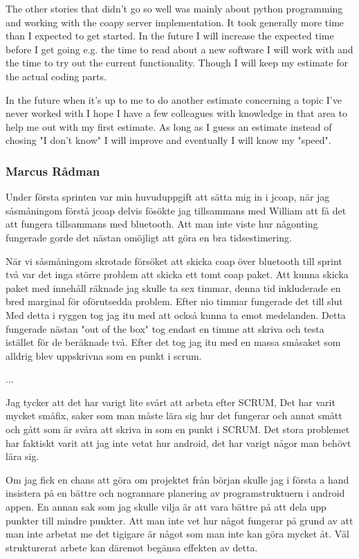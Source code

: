 The other stories that didn't go so well was mainly about python programming and working with the coapy server implementation. 
It took generally more time than I expected to get started.
In the future I will increase the expected time before I get going e.g. the time to read about a new software I will work with and the time to try out the current functionality.
Though I will keep my estimate for the actual coding parts.

In the future when it's up to me to do another estimate concerning a topic I've never worked with I hope I have a few colleagues with knowledge in that area to help me out with my first estimate.
As long as I guess an estimate instead of chosing "I don't know" I will improve and eventually I will know my "speed".

\subsubsection{Marcus Rådman}
Under första sprinten var min huvuduppgift att sätta mig in i jcoap, när jag såsmåningom förstå jcoap delvis fösökte jag tillsammans med William att få det att fungera tillsammans med bluetooth.
Att man inte viste hur någonting fungerade gorde det nästan omöjligt att göra en bra tidsestimering. 

När vi såsmåningom skrotade försöket att skicka coap över bluetooth till sprint två var det inga större problem att skicka ett tomt coap paket.
Att kunna skicka paket med innehåll räknade jag skulle ta sex timmar, denna tid inkluderade en bred marginal för oförutsedda problem. Efter nio timmar fungerade det till slut
Med detta i ryggen tog jag itu med att också kunna ta emot medelanden. Detta fungerade nästan "out of the box" tog endast en timme att skriva och testa istället för de beräknade två.
Efter det tog jag itu med en massa småsaket som alldrig blev uppskrivna som en punkt i scrum.

...

Jag tycker att det har varigt lite svårt att arbeta efter SCRUM, 
Det har varit mycket småfix, saker som man måste lära sig hur det fungerar och annat smått och gått som är svåra att skriva in som en punkt i SCRUM.
Det stora problemet har faktiskt varit att jag inte vetat hur android, det har varigt någor man behövt lära sig. 

Om jag fick en chans att göra om projektet från början skulle jag i första a hand insistera på en bättre och nogrannare planering av programstruktuern i android appen.
En annan sak som jag skulle vilja är att vara bättre på att dela upp punkter till mindre punkter.
Att man inte vet hur något fungerar på grund av att man inte arbetat me det tigigare är något som man inte kan göra mycket åt. Väl strukturerat arbete kan däremot begänsa effekten av detta.
